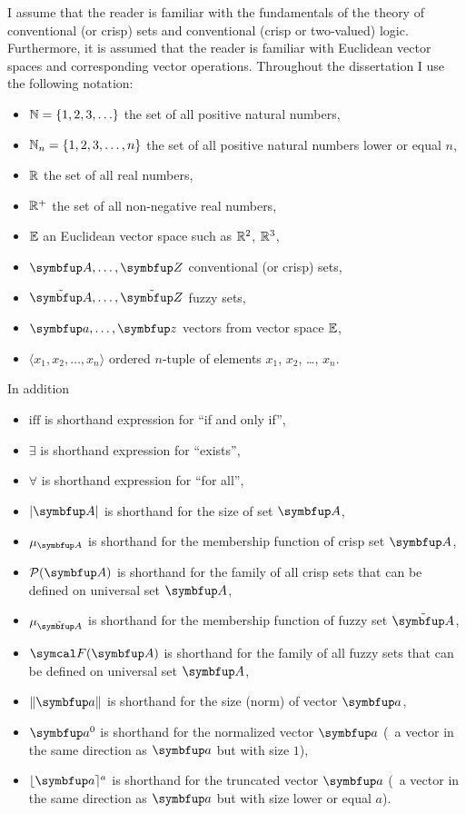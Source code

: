 I assume that the reader is familiar with the fundamentals of the theory of conventional (or crisp) sets and conventional (crisp or two-valued) logic. Furthermore, it is assumed that the reader is familiar with Euclidean vector spaces and corresponding vector operations. Throughout the dissertation I use the following notation:

\begin{itemize}
  \item $\mathbb{N}=\left\{1,2,3,\ldots\right\}$ the set of all positive natural numbers,
  \item $\mathbb{N}_n=\left\{1,2,3,\ldots,n\right\}$ the set of all positive natural numbers lower or equal $n$,
  \item $\mathbb{R}$ the set of all real numbers,
  \item $\mathbb{R}^+$ the set of all non-negative real numbers,
  \item $\mathbb{E}$ an Euclidean vector space such as $\mathbb{R}^2$, $\mathbb{R}^3$,
  \item $\set{A},\ldots,\set{Z}$ conventional (or crisp) sets,
  \item $\fset{A},\ldots,\fset{Z}$ fuzzy sets,
  \item $\vect{a},\ldots,\vect{z}$ vectors from vector space $\mathbb{E}$,
  \item $\langle x_1,x_2,\ldots,x_n \rangle$ ordered $n$-tuple of elements $x_1$, $x_2$, \ldots, $x_n$.
\end{itemize}

\noindent In addition
\begin{itemize}
  \item $\mathrm{iff}$ is shorthand expression for ``if and only if'',
  \item $\exists$ is shorthand expression for ``exists'',
  \item $\forall$ is shorthand expression for ``for all'',
  \item $\left|\set{A}\right|$ is shorthand for the size of set $\set{A}$,
  \item $\mu_\set{A}$ is shorthand for the membership function of crisp set $\set{A}$,
  \item $\powset{\set{A}}$ is shorthand for the family of all crisp sets that can be defined on universal set $\set{A}$,
  \item $\mu_\fset{A}$ is shorthand for the membership function of fuzzy set $\fset{A}$,
  \item $\fpowset{\set{A}}$ is shorthand for the family of all fuzzy sets that can be defined on universal set $\set{A}$,
  \item $\left\|\vect{a}\right\|$ is shorthand for the size (norm) of vector $\vect{a}$,
  \item $\vect{a}^0$ is shorthand for the normalized vector $\vect{a}$ (\ie\ a vector in the same direction as $\vect{a}$ but with size $1$),
  \item $\lfloor\vect{a}\rceil^a$ is shorthand for the truncated vector $\vect{a}$ (\ie\ a vector in the same direction as $\vect{a}$ but with size lower or equal $a$).
\end{itemize}
